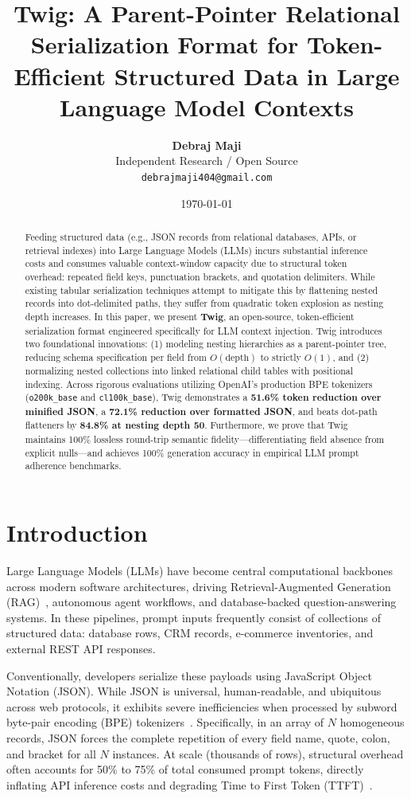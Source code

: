\documentclass[11pt,a4paper]{article}
\title{\textbf{Twig: A Parent-Pointer Relational Serialization Format for Token-Efficient Structured Data in Large Language Model Contexts}}
\author{
  \textbf{Debraj Maji}\\
  Independent Research / Open Source\\
  \texttt{debrajmaji404@gmail.com}
}
\date{\today}
\begin{document}
\maketitle

\begin{abstract}
Feeding structured data (e.g., JSON records from relational databases, APIs, or retrieval indexes) into Large Language Models (LLMs) incurs substantial inference costs and consumes valuable context-window capacity due to structural token overhead: repeated field keys, punctuation brackets, and quotation delimiters. While existing tabular serialization techniques attempt to mitigate this by flattening nested records into dot-delimited paths, they suffer from quadratic token explosion as nesting depth increases. In this paper, we present \textbf{Twig}, an open-source, token-efficient serialization format engineered specifically for LLM context injection. Twig introduces two foundational innovations: (1) modeling nesting hierarchies as a parent-pointer tree, reducing schema specification per field from $O(\text{depth})$ to strictly $O(1)$, and (2) normalizing nested collections into linked relational child tables with positional indexing. Across rigorous evaluations utilizing OpenAI's production BPE tokenizers (\texttt{o200k\_base} and \texttt{cl100k\_base}), Twig demonstrates a \textbf{51.6\% token reduction over minified JSON}, a \textbf{72.1\% reduction over formatted JSON}, and beats dot-path flatteners by \textbf{84.8\% at nesting depth 50}. Furthermore, we prove that Twig maintains 100\% lossless round-trip semantic fidelity—differentiating field absence from explicit nulls—and achieves 100\% generation accuracy in empirical LLM prompt adherence benchmarks.
\end{abstract}

\section{Introduction}
Large Language Models (LLMs) have become central computational backbones across modern software architectures, driving Retrieval-Augmented Generation (RAG)~\cite{lewis2020retrieval}, autonomous agent workflows, and database-backed question-answering systems. In these pipelines, prompt inputs frequently consist of collections of structured data: database rows, CRM records, e-commerce inventories, and external REST API responses.

Conventionally, developers serialize these payloads using JavaScript Object Notation (JSON). While JSON is universal, human-readable, and ubiquitous across web protocols, it exhibits severe inefficiencies when processed by subword byte-pair encoding (BPE) tokenizers~\cite{sennrich2016neural}. Specifically, in an array of $N$ homogeneous records, JSON forces the complete repetition of every field name, quote, colon, and bracket for all $N$ instances. At scale (thousands of rows), structural overhead often accounts for 50\% to 75\% of total consumed prompt tokens, directly inflating API inference costs and degrading Time to First Token (TTFT)~\cite{jiang2023llmlingua, jiang2024longllmlingua}.
\end{document}
